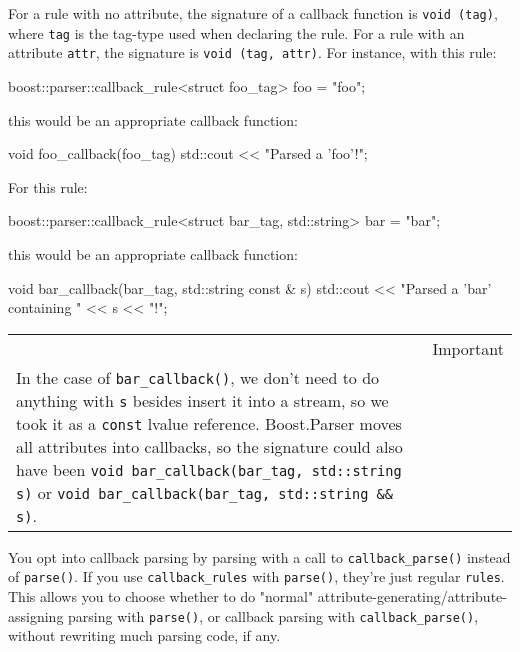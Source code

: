 For a rule with no attribute, the signature of a callback function is \texttt{void (tag)}, where \texttt{tag} is the tag-type used when declaring the rule. For a rule with an attribute \texttt{attr}, the signature is \texttt{void (tag, attr)}. For instance, with this rule:

\begin{code}
boost::parser::callback_rule<struct foo_tag> foo = "foo";
\end{code}

this would be an appropriate callback function:

\begin{code}
void foo_callback(foo_tag)
{
    std::cout << "Parsed a 'foo'!\n";
}
\end{code}

For this rule:

\begin{code}
boost::parser::callback_rule<struct bar_tag, std::string> bar = "bar";
\end{code}

this would be an appropriate callback function:

\begin{code}
void bar_callback(bar_tag, std::string const & s)
{
    std::cout << "Parsed a 'bar' containing " << s << "!\n";
}
\end{code}

\begin{longtable}[]{@{}
  >{\raggedright\arraybackslash}p{}
  >{\raggedright\arraybackslash}p{}@{}}
\toprule\noalign{}
\endhead
\bottomrule\noalign{}
\endlastfoot
\begin{minipage}[t]{\linewidth}\raggedright
\end{minipage} & Important \\
In the case of \texttt{bar\_callback()}, we don't need to do anything with \texttt{s} besides insert it into a stream, so we took it as a \texttt{const} lvalue reference. Boost.Parser moves all attributes into callbacks, so the signature could also have been \texttt{void bar\_callback(bar\_tag, std::string s)} or \texttt{void bar\_callback(bar\_tag, std::string \&\& s)}. & \\
\end{longtable}

You opt into callback parsing by parsing with a call to \texttt{callback\_parse()} instead of \texttt{parse()}. If you use \texttt{callback\_rules} with \texttt{parse()}, they're just regular \texttt{rules}. This allows you to choose whether to do "normal" attribute-generating/attribute-assigning parsing with \texttt{parse()}, or callback parsing with \texttt{callback\_parse()}, without rewriting much parsing code, if any.

